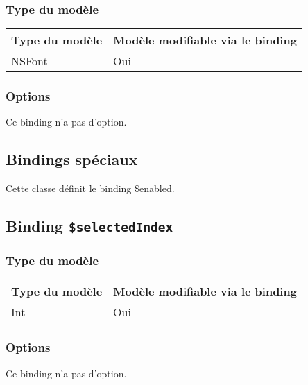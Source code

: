 \subsubsection{Type du modèle}

\begin{tabular}{|l|l|}
\hline
\textbf{Type du modèle} & \textbf{Modèle modifiable via le binding}\\
\hline
NSFont & Oui\\
\hline
\end{tabular}
\subsubsection{Options}

Ce binding n'a pas d'option.









\subsection{Bindings spéciaux}

Cette classe définit le binding \$enabled.

\subsection{Binding \texttt{\$selectedIndex}}

\subsubsection{Type du modèle}

\begin{tabular}{|l|l|}
\hline
\textbf{Type du modèle} & \textbf{Modèle modifiable via le binding}\\
\hline
Int & Oui\\
\hline
\end{tabular}
\subsubsection{Options}

Ce binding n'a pas d'option.








